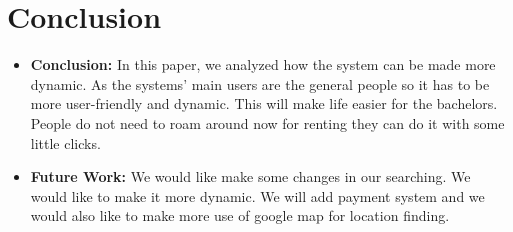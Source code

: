 \documentclass[12pt,a4paper]{article}
\newcommand\tab[1][.7cm]{\hspace*{#1}}
\begin{document}
	\section*{Conclusion}
	\tab {In this following chapter, we sum our work in brief and conclude the paper. We also represent a future
works which we could not able to do because of some contradictions we face during our research. We
will work more on this and we have mentioned in the future work what we tend to o next.}
	\begin{itemize}
		\item \textbf{Conclusion: }In this paper, we analyzed how the system can be made more dynamic. As the systems’ main users are
the general people so it has to be more user-friendly and dynamic. This will make life easier for the
bachelors. People do not need to roam around now for renting they can do it with some little clicks.
		\item \textbf{Future Work: }We would like make some changes in our searching. We would like to make it more dynamic. We will
add payment system and we would also like to make more use of google map for location finding.
	\end{itemize}
	
\end{document}
